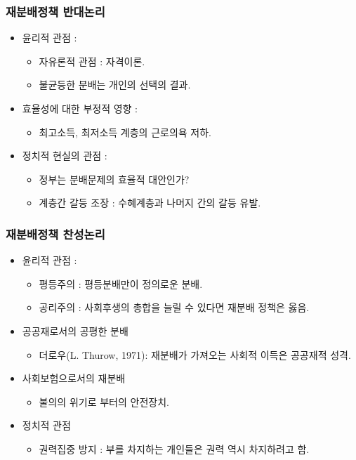 \documentclass[aspectratio=169,xcolor=dvipsnames,handout]{beamer}
\begin{document}
\begin{frame}[<+->]
\frametitle{재분배정책 반대논리}
    \begin{itemize}
        \item 윤리적 관점 :
        \begin{itemize}
            \item 자유론적 관점 : 자격이론.
            \item 불균등한 분배는 개인의 선택의 결과.
        \end{itemize}
        \item 효율성에 대한 부정적 영향 :
        \begin{itemize}
            \item 최고소득, 최저소득 계층의 근로의욕 저하.
        \end{itemize}
        \item 정치적 현실의 관점 : 
        \begin{itemize}
            \item 정부는 분배문제의 효율적 대안인가?
            \item 계층간 갈등 조장 : 수혜계층과 나머지 간의 갈등 유발.  
        \end{itemize}
    \end{itemize}
\end{frame}

\begin{frame}[<+->]
\frametitle{재분배정책 찬성논리}
    \begin{itemize}
        \item 윤리적 관점 : 
        \begin{itemize}
            \item 평등주의 : 평등분배만이 정의로운 분배.
            \item 공리주의 : 사회후생의 총합을 늘릴 수 있다면 재분배 정책은 옳음.
        \end{itemize}
        \item 공공재로서의 공평한 분배
        \begin{itemize}
            \item 더로우(L. Thurow, 1971): 재분배가 가져오는 사회적 이득은 공공재적 성격.
        \end{itemize}
        \item 사회보험으로서의 재분배
        \begin{itemize}
            \item 불의의 위기로 부터의 안전장치.
        \end{itemize}
        \item 정치적 관점
        \begin{itemize}
            \item 권력집중 방지 : 부를 차지하는 개인들은 권력 역시 차지하려고 함.
        \end{itemize}
    \end{itemize}
\end{frame}
\end{document}
